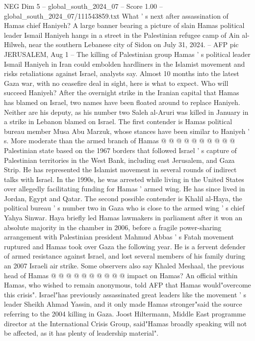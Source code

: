 \begin{textsample}{NEG Dim 5 – global\_south\_2024\_07 – Score 1.00 – global\_south\_2024\_07/111543859.txt}  \label{ex:f5_neg_298}
What ' s next after assassination of Hamas chief Haniyeh?
A large banner bearing a picture of slain Hamas political leader Ismail Haniyeh hangs in a street in the Palestinian refugee camp of Ain al-Hilweh, near the southern Lebanese city of Sidon on July 31, 2024. -- AFP pic JERUSALEM, Aug 1 -- The killing of Palestinian group Hamas ' s political leader Ismail Haniyeh in Iran could embolden hardliners in the Islamist movement and risks retaliations against Israel, analysts say.
Almost 10 months into the latest Gaza war, with no ceasefire deal in sight, here is what to expect.
Who will succeed Haniyeh?
After the overnight strike in the Iranian capital that Hamas has blamed on Israel, two names have been floated around to replace Haniyeh.
Neither are his deputy, as his number two Saleh al-Aruri was killed in January in a strike in Lebanon blamed on Israel.
The first contender is Hamas political bureau member Musa Abu Marzuk, whose stances have been similar to Haniyeh ' s.
More moderate than the armed branch of Hamas @ @ @ @ @ @ @ @ @ @ Palestinian state based on the 1967 borders that followed Israel ' s capture of Palestinian territories in the West Bank, including east Jerusalem, and Gaza Strip.
He has represented the Islamist movement in several rounds of indirect talks with Israel.
In the 1990s, he was arrested while living in the United States over allegedly facilitating funding for Hamas ' armed wing.
He has since lived in Jordan, Egypt and Qatar.
The second possible contender is Khalil al-Haya, the political bureau ' s number two in Gaza who is close to the armed wing ' s chief Yahya Sinwar.
Haya briefly led Hamas lawmakers in parliament after it won an absolute majority in the chamber in 2006, before a fragile power-sharing arrangement with Palestinian president Mahmud Abbas ' s Fatah movement ruptured and Hamas took over Gaza the following year.
He is a fervent defender of armed resistance against Israel, and lost several members of his family during an 2007 Israeli air strike.
Some observers also say Khaled Meshaal, the previous head of Hamas @ @ @ @ @ @ @ @ @ @ impact on Hamas?
An official within Hamas, who wished to remain anonymous, told AFP that Hamas would"overcome this crisis".
Israel"has previously assassinated great leaders like the movement ' s leader Sheikh Ahmad Yassin, and it only made Hamas stronger"said the source referring to the 2004 killing in Gaza.
Joost Hiltermann, Middle East programme director at the International Crisis Group, said"Hamas broadly speaking will not be affected, as it has plenty of leadership material".

\end{textsample}

